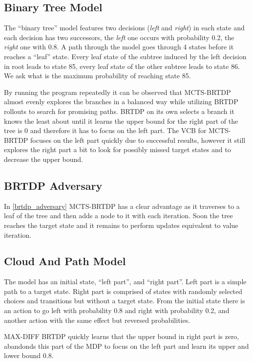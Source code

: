 \subsection*{Binary Tree Model}

The ``binary tree'' model features two decisions ({\em left} and {\em
right}) in each state and each decision has two successors,
the {\em left} one occurs with probability 0.2,
the {\em right} one with 0.8. A path through the model goes through 4 states
before it reaches a ``leaf'' state. Every leaf state of the subtree
induced by the left decision in root leads to state 85, every leaf state
of the other subtree leads to state 86. We ask what is the maximum
probability of reaching state 85.

By running the program repeatedly it can be observed that MCTS-BRTDP
almost evenly explores the branches in a balanced way while utilizing
BRTDP rollouts to search for promising paths. BRTDP on its own
selects a branch it knows the least about until it learns the upper bound
for the right part of the tree is 0 and therefore it has to focus on the
left part. The VCB for MCTS-BRTDP focuses on the left part quickly due
to successful results, however it still explores the right part a bit to
look for possibly missed target states and to decrease the upper bound.

\subsection*{BRTDP Adversary}

In \autoref{brtdp_adversary} MCTS-BRTDP has a clear advantage as it
traverses to a leaf of the tree and then adds a node to it with each iteration.
Soon the tree reaches the target state and it remains to perform updates
equivalent to value iteration.


\subsection*{Cloud And Path Model}

The model has an initial state,
``left part'', and ``right part''. Left part is a simple path to a
target state. Right part is comprised of states with randomly selected
choices and transitions but without a target state.
From the initial state there is an action to go left with probability
0.8 and right with probability 0.2, and another action with the same
effect but reversed probabilities.

MAX-DIFF BRTDP quickly learns that the upper bound in right part is
zero, abandonds this part of the MDP to focus on the left part and learn
its upper and lower bound 0.8.

